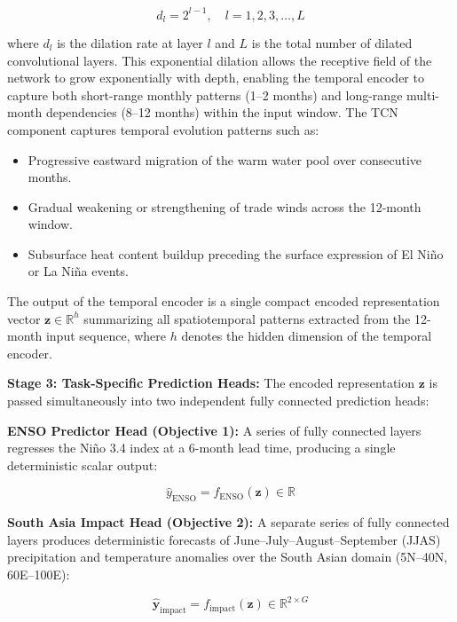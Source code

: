 \begin{equation}
d_l = 2^{l-1}, \quad l = 1, 2, 3, \ldots, L
\end{equation}

\noindent where $d_l$ is the dilation rate at layer $l$ and $L$ is the total number of dilated convolutional layers. This exponential dilation allows the receptive field of the network to grow exponentially with depth, enabling the temporal encoder to capture both short-range monthly patterns (1--2 months) and long-range multi-month dependencies (8--12 months) within the input window. The TCN component captures temporal evolution patterns such as:

\begin{itemize}
    \item Progressive eastward migration of the warm water pool over consecutive months.
    \item Gradual weakening or strengthening of trade winds across the 12-month window.
    \item Subsurface heat content buildup preceding the surface expression of El Ni\~{n}o or La Ni\~{n}a events.
\end{itemize}

The output of the temporal encoder is a single compact encoded representation vector $\mathbf{z} \in \mathbb{R}^{h}$ summarizing all spatiotemporal patterns extracted from the 12-month input sequence, where $h$ denotes the hidden dimension of the temporal encoder.

\textbf{Stage 3: Task-Specific Prediction Heads:} The encoded representation $\mathbf{z}$ is passed simultaneously into two independent fully connected prediction heads:

\textbf{ENSO Predictor Head (Objective 1):} A series of fully connected layers regresses the Ni\~{n}o 3.4 index at a 6-month lead time, producing a single deterministic scalar output:

\begin{equation}
\hat{y}_{\text{ENSO}} = f_{\text{ENSO}}(\mathbf{z}) \in \mathbb{R}
\end{equation}

\textbf{South Asia Impact Head (Objective 2):} A separate series of fully connected layers produces deterministic forecasts of June--July--August--September (JJAS) precipitation and temperature anomalies over the South Asian domain (5\degree N--40\degree N, 60\degree E--100\degree E):

\begin{equation}
\hat{\mathbf{y}}_{\text{impact}} = f_{\text{impact}}(\mathbf{z}) \in \mathbb{R}^{2 \times G}
\end{equation}

